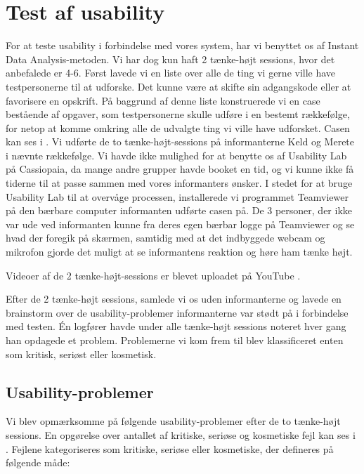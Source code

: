 \section{Test af usability}
\label{sec:usability}

For at teste usability i forbindelse med vores system, har vi benyttet os af Instant Data Analysis-metoden\cite{debida}. Vi har dog kun haft 2 tænke-højt sessions, hvor det anbefalede er 4-6. Først lavede vi en liste over alle de ting vi gerne ville have testpersonerne til at udforske. Det kunne \fx være at skifte sin adgangskode eller at favorisere en opskrift. På baggrund af denne liste konstruerede vi en case bestående af opgaver, som testpersonerne skulle udføre i en bestemt rækkefølge, for netop at komme omkring alle de udvalgte ting vi ville have udforsket. Casen kan ses i . Vi udførte de to tænke-højt-sessions på informanterne Keld og Merete i nævnte rækkefølge. Vi havde ikke mulighed for at benytte os af Usability Lab på Cassiopaia, da mange andre grupper havde booket en tid, og vi kunne ikke få tiderne til at passe sammen med vores informanters ønsker. I stedet for at bruge Usability Lab til at overvåge processen, installerede vi programmet Teamviewer på den bærbare computer informanten udførte casen på. De 3 personer, der ikke var ude ved informanten kunne fra deres egen bærbar logge på Teamviewer og se hvad der foregik på skærmen, samtidig med at det indbyggede webcam og mikrofon gjorde det muligt at se informantens reaktion og høre ham tænke højt.

Videoer af de 2 tænke-højt-sessions er blevet uploadet på YouTube \cite{usabilitykjeld} \cite{usabilitymerete}.

Efter de 2 tænke-højt sessions, samlede vi os uden informanterne og lavede en brainstorm over de usability-problemer informanterne var stødt på i forbindelse med testen. Én logfører havde under alle tænke-højt sessions noteret hver gang han opdagede et problem. Problemerne vi kom frem til blev klassificeret enten som kritisk, seriøst eller kosmetisk.

\subsection{Usability-problemer}
Vi blev opmærksomme på følgende usability-problemer efter de to tænke-højt sessions. En opgørelse over antallet af kritiske, seriøse og kosmetiske fejl kan ses i . Fejlene kategoriseres som kritiske, seriøse eller kosmetiske, der defineres på følgende måde:

